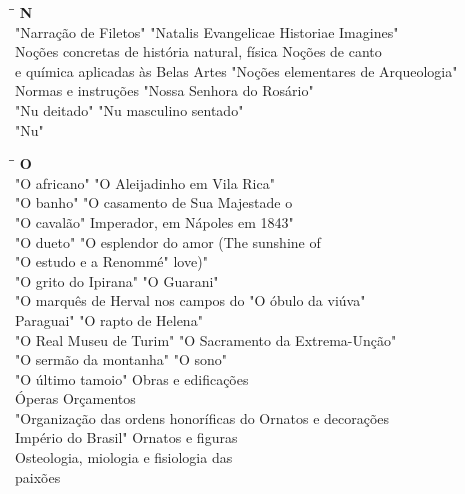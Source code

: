 \begin{tabbing}
	\hspace{8,7cm}\=\hspace{1cm}\=\kill
	\textbf{N} \>  \\ 
	"Narração de Filetos" \> "Natalis Evangelicae Historiae Imagines"\\
	Noções concretas de história natural, física \> Noções de canto\\
	e química aplicadas às Belas Artes\> "Noções elementares de Arqueologia"\\
	Normas e instruções \> "Nossa Senhora do Rosário"\\ 
	"Nu deitado" \>  "Nu masculino sentado"\\ 
	"Nu" \> \\ 
\end{tabbing}

\begin{tabbing}
	\hspace{8,7cm}\=\hspace{1cm}\=\kill
	\textbf{O} \>  \\ 
	"O africano" \> "O Aleijadinho em Vila Rica"\\
	"O banho" \> "O casamento de Sua Majestade o\\
	"O cavalão"\> Imperador, em Nápoles em 1843"\\
	"O dueto" \> "O esplendor do amor (The sunshine of\\ 
	"O estudo e a Renommé" \>  love)"\\ 
	"O grito do Ipirana" \> "O Guarani"\\ 
	"O marquês de Herval nos campos do  \> "O óbulo da viúva"\\
	Paraguai" \> "O rapto de Helena"\\
	"O Real Museu de Turim" \> "O Sacramento da Extrema-Unção"\\
	"O sermão da montanha" \> "O sono"\\
	"O último tamoio" \> Obras e edificações\\
	Óperas \> Orçamentos\\
	"Organização das ordens honoríficas do \> Ornatos e decorações\\
	Império do Brasil"\> Ornatos e figuras\\
	Osteologia, miologia e fisiologia das \> \\
	paixões \> \\
\end{tabbing}

